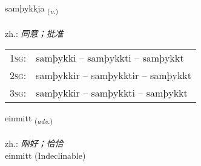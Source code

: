\documentclass[frontgrid, backgrid]{flacards}\usepackage[]{graphicx}\usepackage[]{xcolor}
\begin{document}
\renewcommand{\flhead}{\vskip5pt \fboxsep=0pt {\small\bfseries\footnotesize Sagnorð | 动词}}
\renewcommand{\fcfoot}{\vskip5pt \fboxsep=0pt \hspace{2pt}{\small\bfseries\footnotesize 1K}}

\renewcommand{\blhead}{\vskip5pt {\small\bfseries\footnotesize Sagnorð | 动词 }}
\renewcommand{\bcfoot}{\vskip5pt \hspace{2pt}{\small\bfseries\footnotesize 1K}}


{samþykkja \small{\textsubscript{(\textit{v.})}} \\[1ex] %
\textphonetic{[samθɪhca]} \\
zh.: \emph{同意；批准} \\  [2ex]
\renewcommand*{\arraystretch}{0.8}
\begin{tabular}{p{1cm}l}
\textsc{1sg}: & samþykki -- samþykkti -- samþykkt \\ 
\textsc{2sg}: & samþykkir -- samþykktir -- samþykkt \\ 
\textsc{3sg}: & samþykkir -- samþykkti -- samþykkt \\ 
\end{tabular}
}


\renewcommand{\flhead}{\vskip5pt \fboxsep=0pt {\small\bfseries\footnotesize Atviksorð | 副词}}
\renewcommand{\fcfoot}{\vskip5pt \fboxsep=0pt \hspace{2pt}{\small\bfseries\footnotesize 1K}}

\renewcommand{\blhead}{\vskip5pt {\small\bfseries\footnotesize Atviksorð | 副词 }}
\renewcommand{\bcfoot}{\vskip5pt \hspace{2pt}{\small\bfseries\footnotesize 1K}}


{einmitt \small{\textsubscript{(\textit{adv.})}} \\[1ex]
\textphonetic{[einmɪht]} \\
zh.: \emph{刚好；恰恰} \\  [2ex]
einmitt (Indeclinable)}
\end{document}
